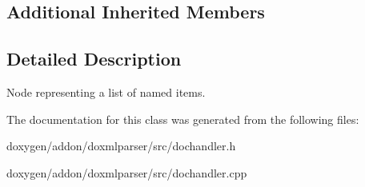 \subsection*{Additional Inherited Members}


\subsection{Detailed Description}
Node representing a list of named items. 



The documentation for this class was generated from the following files\+:\begin{DoxyCompactItemize}
\item 
doxygen/addon/doxmlparser/src/dochandler.\+h\item 
doxygen/addon/doxmlparser/src/dochandler.\+cpp\end{DoxyCompactItemize}
